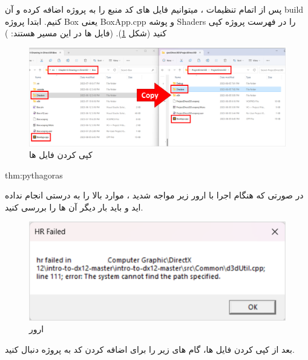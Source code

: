 \textbf{\vspace{-30pt}}
\title{
    \LARGE
}
\textbf{\vspace{-15pt}}

{
    \Large
    \begin{spacing}{1.3}
        پس از اتمام تنظیمات ، میتوانیم فایل های کد منبع را به پروژه اضافه کرده و آن build کنیم.
        ابتدا پروژه Box یعنی BoxApp.cpp و پوشه Shaders را در فهرست پروژه کپی کنید (شکل \ref{fig:3.Intro.5.8.1}).
        (فایل ها در این مسیر هستند: )

        \begin{figure}[H]
            \centering
            \setlength{\belowcaptionskip}{-10pt}
            \includegraphics[width=\textwidth]{Images/3/3.Intro.5.8.1}
            \caption{کپی کردن فایل ها}
            \label{fig:3.Intro.5.8.1}
        \end{figure}

        \begin{point}{thm:pythagoras}
        {
            \Large
            در صورتی که هنگام اجرا با ارور زیر مواجه شدید ، موارد بالا را به درستی انجام نداده اید و باید بار دیگر آن ها را بررسی کنید.

            \begin{figure}[H]
                \centering
                \setlength{\belowcaptionskip}{-10pt}
                \includegraphics[scale=0.8]{Images/3/3.Intro.5.8.2}
                \caption{ارور  \textbf{\vspace{12pt}}}
                \label{fig:3.Intro.5.8.2}
            \end{figure}
        }
        \end{point}
        \textbf{\vspace{6pt}}
        بعد از کپی کردن فایل ها، گام های زیر را برای اضافه کردن کد به پروژه دنبال کنید.


\end{spacing}}
